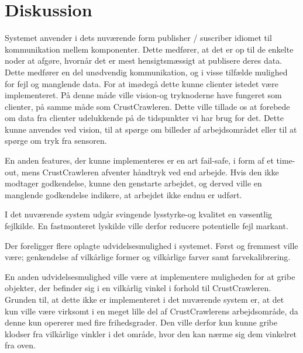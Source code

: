 \chapter{Diskussion}\label{chap:Diskussion}
Systemet anvender i dets nuværende form publisher / suscriber idiomet til kommunikation mellem komponenter.
Dette medfører, at det er op til de enkelte noder at afgøre, hvornår det er mest hensigtsmæssigt at publisere deres data.
Dette medfører en del unødvendig kommunikation, og i visse tilfælde mulighed for fejl og manglende data. 
For at imødegå dette kunne clienter istedet være implementeret.
På denne måde ville vision-og tryknoderne have fungeret som clienter, på samme måde som CrustCrawleren.
Dette ville tillade os at forebede om data fra clienter udelukkende på de tidspunkter vi har brug for det.
Dette kunne anvendes ved vision, til at spørge om billeder af arbejdsområdet eller til at spørge om tryk fra sensoren. 

En anden features, der kunne implementeres er en art fail-safe, i form af et time-out, mens CrustCrawleren afventer håndtryk ved end arbejde.
Hvis den ikke modtager godkendelse, kunne den genstarte arbejdet, og derved ville en manglende godkendelse indikere, at arbejdet ikke endnu er udført.

I det nuværende system udgår svingende lysstyrke-og kvalitet en væsentlig fejlkilde.
En fastmonteret lyskilde ville derfor reducere potentielle fejl markant.

Der foreligger flere oplagte udvidelsesmulighed i systemet.
Først og fremmest ville være; genkendelse af vilkårlige former og vilkårlige farver samt farvekalibrering.

En anden udvidelsesmulighed ville være at implementere muligheden for at gribe objekter, der befinder sig i en vilkårlig vinkel i forhold til CrustCrawleren.
Grunden til, at dette ikke er implementeret i det nuværende system er, at det kun ville være virksomt i en meget lille del af CrustCrawlerens arbejdsområde, da denne kun opererer med fire frihedsgrader.
Den ville derfor kun kunne gribe klodser fra vilkårlige vinkler i det område, hvor den kan nærme sig dem vinkelret fra oven. 